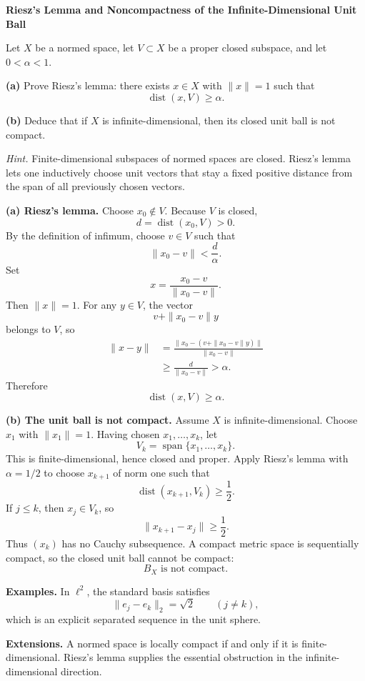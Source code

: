 \begin{problem}[CP-II-0551]
\label{prob:cp-ii-0551}
\textbf{Riesz's Lemma and Noncompactness of the Infinite-Dimensional Unit Ball}

\hspace*{1.5em}Let \(X\) be a normed space, let \(V\subset X\) be a proper closed subspace,
and let \(0<\alpha<1\).

\par\smallskip\noindent\textbf{(a)}\quad
Prove Riesz's lemma: there exists \(x\in X\) with \(\|x\|=1\) such that
\[
\operatorname{dist}(x,V)\ge\alpha.
\]

\par\smallskip\noindent\textbf{(b)}\quad
Deduce that if \(X\) is infinite-dimensional, then its closed unit ball is not
compact.

\medskip
\noindent\emph{Hint.} Finite-dimensional subspaces of normed spaces are closed. Riesz's lemma lets
one inductively choose unit vectors that stay a fixed positive distance from
the span of all previously chosen vectors.
\end{problem}

\begin{solution}

\par\smallskip\noindent\textbf{(a) Riesz's lemma.}
Choose \(x_0\notin V\). Because \(V\) is closed,
\[
d=\operatorname{dist}(x_0,V)>0.
\]
By the definition of infimum, choose \(v\in V\) such that
\[
\|x_0-v\|<\frac d\alpha.
\]
Set
\[
x=\frac{x_0-v}{\|x_0-v\|}.
\]
Then \(\|x\|=1\). For any \(y\in V\), the vector
\[
v+\|x_0-v\|y
\]
belongs to \(V\), so
\[
\begin{aligned}
\|x-y\|
&=
\frac{\|x_0-(v+\|x_0-v\|y)\|}{\|x_0-v\|}\\
&\ge
\frac d{\|x_0-v\|}
>\alpha.
\end{aligned}
\]
Therefore
\[
\boxed{\operatorname{dist}(x,V)\ge\alpha.}
\]

\par\smallskip\noindent\textbf{(b) The unit ball is not compact.}
Assume \(X\) is infinite-dimensional. Choose \(x_1\) with \(\|x_1\|=1\).
Having chosen \(x_1,\dots,x_k\), let
\[
V_k=\operatorname{span}\{x_1,\dots,x_k\}.
\]
This is finite-dimensional, hence closed and proper. Apply Riesz's lemma with
\(\alpha=1/2\) to choose \(x_{k+1}\) of norm one such that
\[
\operatorname{dist}(x_{k+1},V_k)\ge\frac12.
\]
If \(j\le k\), then \(x_j\in V_k\), so
\[
\|x_{k+1}-x_j\|\ge\frac12.
\]
Thus \((x_k)\) has no Cauchy subsequence. A compact metric space is
sequentially compact, so the closed unit ball cannot be compact:
\[
\boxed{B_X\text{ is not compact}.}
\]

\medskip
\noindent\textbf{Examples.}
In \(\ell^2\), the standard basis satisfies
\[
\|e_j-e_k\|_2=\sqrt2
\qquad(j\ne k),
\]
which is an explicit separated sequence in the unit sphere.

\medskip
\noindent\textbf{Extensions.}
A normed space is locally compact if and only if it is finite-dimensional.
Riesz's lemma supplies the essential obstruction in the infinite-dimensional
direction.
\end{solution}


